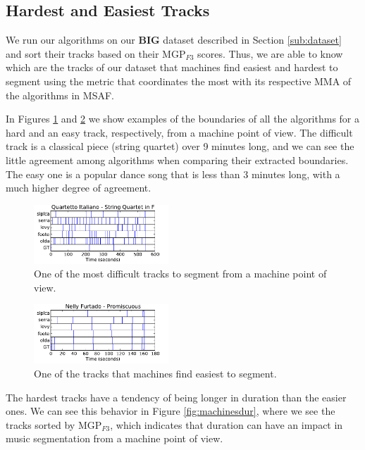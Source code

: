 \documentclass{article}
\begin{document}
\subsection{Hardest and Easiest Tracks}\label{sub:hard-easy}

We run our algorithms on our \textbf{BIG} dataset described in Section \ref{sub:dataset} and sort their tracks based on their MGP$_{F3}$ scores.
Thus, we are able to know which are the tracks of our dataset that machines find easiest and hardest to segment using the metric that coordinates the most with its respective MMA of the algorithms in MSAF.

In Figures \ref{fig:quartetto} and \ref{fig:promiscuous} we show examples of the boundaries of all the algorithms for a hard and an easy track, respectively, from a machine point of view.
The difficult track is a classical piece (string quartet) over 9 minutes long, and we can see the little agreement among algorithms when comparing their extracted boundaries.
The easy one is a popular dance song that is less than 3 minutes long, with a much higher degree of agreement.

\begin{figure}
  \centering
  \includegraphics[width=0.45\textwidth, height=0.13\textheight]{plots/Quartetto.pdf}
  \caption{One of the most difficult tracks to segment from a machine point of view.}
  \label{fig:quartetto}
\end{figure}%

\begin{figure}
  \centering
  \includegraphics[width=0.45\textwidth, height=0.13\textheight]{plots/Promiscuous.pdf}
  \caption{One of the tracks that machines find easiest to segment.}
  \label{fig:promiscuous}
\end{figure}%

The hardest tracks have a tendency of being longer in duration than the easier ones.
We can see this behavior in Figure \ref{fig:machinesdur}, where we see the tracks sorted by MGP$_{F3}$, which indicates that duration can have an impact in music segmentation from a machine point of view.
\end{document}
